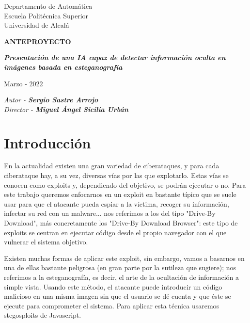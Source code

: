 \documentclass[12pt,oneside,a4paper]{article}
\begin{document}
\thispagestyle{empty}

\begin{center}


Departamento de Automática\\
Escuela Politécnica Superior\\
Universidad de Alcalá\\

\vspace{1cm}


\textbf{ANTEPROYECTO}

\vspace{1cm}

\begin{large}\textbf{\textit{Presentación de una IA capaz de detectar información oculta en imágenes basada en esteganografía}}\end{large}

\vfill

Marzo - 2022

\end{center}

\begin{flushright}
\textit{Autor - \textbf{Sergio Sastre Arrojo}} \\
\textit{Director - \textbf{Miguel Ángel Sicilia Urbán}}
\end{flushright}

\newpage
\section{Introducción}

En la actualidad existen una gran variedad de ciberataques, y para cada ciberataque hay, a su vez, diversas vías por las que explotarlo. Estas vías se conocen como exploits y, dependiendo del objetivo, se podrán ejecutar o no. Para este trabajo queremos enfocarnos en un exploit en bastante típico que se suele usar para que el atacante pueda espiar a la víctima, recoger su información, infectar su red con un malware... nos referimos a los del tipo "Drive-By Download", más concretamente los "Drive-By Download Browser": este tipo de exploits se centran en ejecutar código desde el propio navegador con el que vulnerar el sistema objetivo.

Existen muchas formas de aplicar este exploit, sin embargo, vamos a basarnos en una de ellas bastante peligrosa (en gran parte por la sutileza que sugiere); nos referimos a la esteganografía, es decir, el arte de la ocultación de información a simple vista. Usando este método, el atacante puede introducir un código malicioso en una misma imagen sin que el usuario se dé cuenta y que éste se ejecute para comprometer el sistema. Para aplicar esta técnica usaremos stegosploits de Javascript. \cite{stegosploit}
\end{document}
